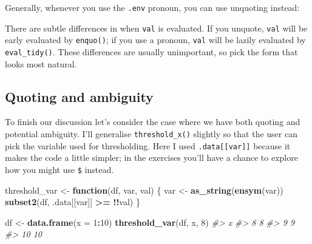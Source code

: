 \documentclass[]{book}
\newenvironment{Shaded}{\begin{snugshade}}{\end{snugshade}}
\newcommand{\CommentTok}[1]{\textcolor[rgb]{0.37,0.37,0.37}{\textit{#1}}}
\newcommand{\ControlFlowTok}[1]{\textcolor[rgb]{0.27,0.27,0.27}{\textbf{#1}}}
\newcommand{\DataTypeTok}[1]{\textcolor[rgb]{0.27,0.27,0.27}{#1}}
\newcommand{\DecValTok}[1]{\textcolor[rgb]{0.06,0.06,0.06}{#1}}
\newcommand{\KeywordTok}[1]{\textcolor[rgb]{0.27,0.27,0.27}{\textbf{#1}}}
\newcommand{\NormalTok}[1]{#1}
\newcommand{\OperatorTok}[1]{\textcolor[rgb]{0.43,0.43,0.43}{\textbf{#1}}}
\newcommand{\StringTok}[1]{\textcolor[rgb]{0.5,0.5,0.5}{#1}}
\begin{document}
Generally, whenever you use the \texttt{.env} pronoun, you can use unquoting instead:

\begin{Shaded}
\end{Shaded}

There are subtle differences in when \texttt{val} is evaluated. If you unquote, \texttt{val} will be early evaluated by \texttt{enquo()}; if you use a pronoun, \texttt{val} will be lazily evaluated by \texttt{eval\_tidy()}. These differences are usually unimportant, so pick the form that looks most natural.

\hypertarget{quoting-and-ambiguity}{%
\subsection{Quoting and ambiguity}\label{quoting-and-ambiguity}}

To finish our discussion let's consider the case where we have both quoting and potential ambiguity. I'll generalise \texttt{threshold\_x()} slightly so that the user can pick the variable used for thresholding. Here I used \texttt{.data{[}{[}var{]}{]}} because it makes the code a little simpler; in the exercises you'll have a chance to explore how you might use \texttt{\$} instead.

\begin{Shaded}
\begin{Highlighting}[]
\NormalTok{threshold_var <-}\StringTok{ }\ControlFlowTok{function}\NormalTok{(df, var, val) \{}
\NormalTok{  var <-}\StringTok{ }\KeywordTok{as_string}\NormalTok{(}\KeywordTok{ensym}\NormalTok{(var))}
  \KeywordTok{subset2}\NormalTok{(df, .data[[var]] }\OperatorTok{>=}\StringTok{ }\OperatorTok{!!}\NormalTok{val)}
\NormalTok{\}}

\NormalTok{df <-}\StringTok{ }\KeywordTok{data.frame}\NormalTok{(}\DataTypeTok{x =} \DecValTok{1}\OperatorTok{:}\DecValTok{10}\NormalTok{)}
\KeywordTok{threshold_var}\NormalTok{(df, x, }\DecValTok{8}\NormalTok{)}
\CommentTok{#>     x}
\CommentTok{#> 8   8}
\CommentTok{#> 9   9}
\CommentTok{#> 10 10}
\end{Highlighting}
\end{Shaded}
\end{document}
